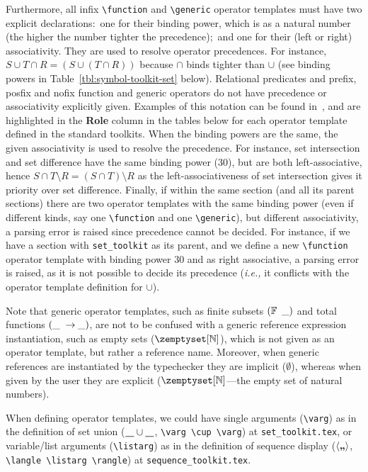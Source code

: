 \documentclass{article}
\newcommand{\emfile}[1]{\texttt{#1}}%
\newcommand{\settkfile}{\emfile{set\_toolkit.tex}}
\newcommand{\seqtkfile}{\emfile{sequence\_toolkit.tex}}
\begin{document}
Furthermore, all infix \verb|\function| and \verb|\generic| operator templates must have two explicit
declarations:~one for their binding power, which is as a natural number (the higher the number tighter the
precedence);~and one for their (left or right) associativity. They are used to resolve operator
precedences. For instance, \mbox{$S \cup T \cap R = (S \cup (T \cap R))$} because $\cap$ binds tighter
than $\cup$ (see binding powers in Table~\ref{tbl:symbol-toolkit-set} below). Relational predicates
and prefix, posfix and nofix function and generic operators do not have precedence or associativity
explicitly given. Examples of this notation can be found in~\cite[Appendix~B]{isoz}, and are highlighted
in the \textbf{Role} column in the tables below for each operator template defined in the standard toolkits.
When the binding powers are the same, the given associativity is used to resolve the precedence.
For instance, set intersection and set difference have the same binding power ($30$), but are
both left-associative, hence $S \cap T \setminus R = (S \cap T) \setminus R$ as the left-associativeness
of set intersection gives it priority over set difference. Finally, if within the same section (and
all its parent sections) there are two operator templates with the same binding power (even if different
kinds, say one \verb|\function| and one \verb|\generic|), but different associativity, a parsing error
is raised since precedence cannot be decided. For instance, if we have a section with \texttt{set\_toolkit}
as its parent, and we define a new \verb|\function| operator template with binding power $30$
and as right associative, a parsing error is raised, as it is not possible to decide its
precedence (\textit{i.e.,} it conflicts with the operator template definition for $\cup$).

Note that generic operator templates, such as finite subsets $(\finset~\_)$ and total functions $(\_~\fun\_)$,
are not to be confused with a generic reference expression instantiation, such as empty sets ($\emptyset[\nat]$),
which is not given as an operator template, but rather a reference name. Moreover, when generic
references are instantiated by the typechecker they are implicit ($\emptyset$), whereas when given by
the user they are explicit ($\emptyset[\nat]$---the empty set of natural numbers).

When defining operator templates, we could have single arguments (\verb|\varg|) as in the
definition of set union ($\varg\cup\varg$, \verb|\varg \cup \varg|) at \settkfile, or variable/list
arguments (\verb|\listarg|) as in the definition of sequence display ($\langle \listarg \rangle$,
\verb|\langle \listarg \rangle|) at \seqtkfile.
\end{document}
